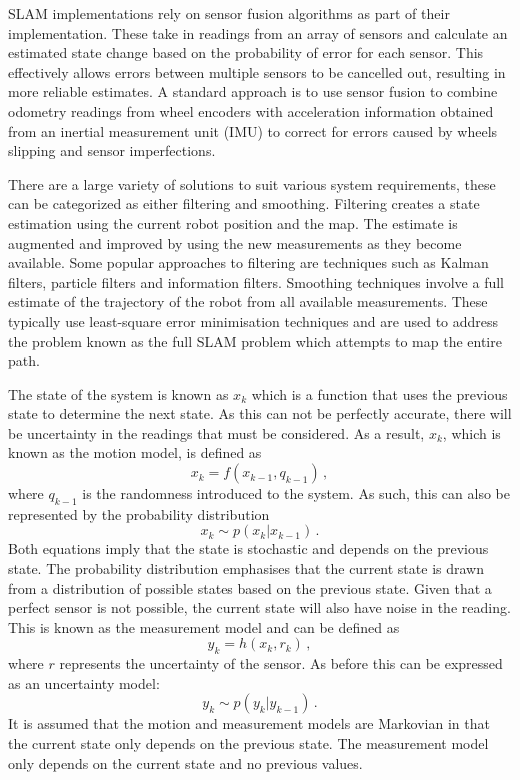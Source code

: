 SLAM implementations rely on sensor fusion algorithms as part of their implementation.
These take in readings from an array of sensors and calculate an estimated state change
based on the probability of error for each sensor. This effectively allows errors between
multiple sensors to be cancelled out, resulting in more reliable estimates. A standard
approach is to use sensor fusion to combine odometry readings from wheel encoders with
acceleration information obtained from an inertial measurement unit (IMU) to correct for
errors caused by wheels slipping and sensor imperfections.

There are a large variety of solutions to suit various system requirements, these
can be categorized as either filtering and smoothing. Filtering creates a state estimation
using the current robot position and the map. The estimate is augmented and improved
by using the new measurements as they become available. Some popular
approaches to filtering are techniques such as Kalman filters, particle filters
and information filters. Smoothing techniques involve a full estimate of the trajectory of
the robot from all available measurements. These typically use least-square error
minimisation techniques and are used to address the problem known as the full SLAM
problem which attempts to map the entire path.

The state of the system is known as $x_k$ which is a function that uses the previous
state to determine the next state. As this can not be perfectly accurate, there will
be uncertainty in the readings that must be considered. As a result, $x_k$,
which is known as the motion model, is defined as
\begin{equation}
x_{k} = f(x_{k-1}, q_{k-1})\,,
\end{equation}
where $q_{k-1}$ is the randomness introduced to the system. As such, this can
also be represented by the probability distribution
\begin{equation}
x_{k} \sim p(x_{k} | x_{k-1})\,.
\end{equation}
Both equations imply that the state is stochastic and depends on the previous
state. The probability distribution emphasises that the current state is
drawn from a distribution of possible states based on the previous state. Given that a perfect sensor is not possible, the current state will also have noise
in the reading. This is known as the measurement model and can be defined as
\begin{equation}
y_{k} = h(x_{k}, r_{k})\,,
\end{equation}
where $r$ represents the uncertainty of the sensor. As
before this can be expressed as an uncertainty model:
\begin{equation}
y_{k} \sim p(y_{k} | y_{k-1})\,.
\end{equation}
It is assumed that the motion and measurement models are Markovian in that
the current state only depends on the previous state. The measurement model only
depends on the current state and no previous values.

